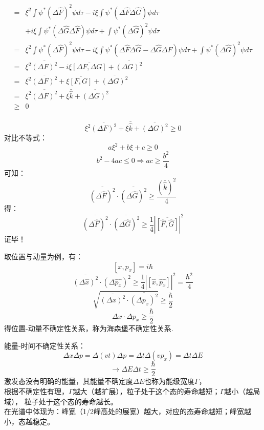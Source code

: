 \begin{frame}   
    $$
    \begin{aligned}
    =& \xi^{2} \int \psi^{*}(\Delta \hat{F})^{2} \psi d \tau-i \xi \int \psi^{*}(\Delta \hat{F} \Delta \hat{G}) \psi d \tau \\
    &+i \xi \int \psi^{*}(\Delta \hat{G} \Delta \hat{F}) \psi d \tau+\int \psi^{*}(\Delta \hat{G})^{2} \psi d \tau \\
    =& \xi^{2} \int \psi^{*}(\Delta \hat{F})^{2} \psi d \tau-i \xi \int \psi^{*}(\Delta \hat{F} \Delta \hat{G}-\Delta \hat{G} \Delta \hat{F}) \psi d \tau+\int \psi^{*}(\Delta \hat{G})^{2} \psi d \tau \\
    =& \xi^{2} \overline{(\Delta F)^{2}}-i \xi \overline{[\Delta F, \Delta G]}+\overline{(\Delta G)^{2}}\\
    =&\xi^{2} \overline{(\Delta F)^{2}}+\xi \overline{[F, G]}+\overline{(\Delta G)^{2}} \\
    =&\xi^{2} \overline{(\Delta F)^{2}}+\xi \bar{\hat{k}}+\overline{(\Delta G)^{2}} \\
    \geq & 0\\
    \end{aligned}
    $$
\end{frame} 

\begin{frame} 
    \[\xi^{2} \overline{(\Delta F)^{2}}+\xi \bar{\hat{k}}+\overline{(\Delta G)^{2}} \geq  0\]  
    对比不等式：
    $$
    a \xi^{2}+b \xi+c \geq 0
    $$
    $$
    b^{2}-4 a c \leq 0 \Rightarrow a c \geq \frac{b^{2}}{4}
    $$
    可知： 
    $$
    \overline{(\Delta \hat{F})^{2}} \cdot \overline{(\Delta \hat{G})^{2}} \geq \frac{(\bar{\hat{k}})^{2}}{4}
    $$
    得： 
    $$
    \boxed{\overline{(\Delta \hat{F})^{2}} \cdot \overline{(\Delta \hat{G})^{2}} \geq \frac{1}{4}|\overline{[\hat{F}, \hat{G}]}|^{2}}
    $$
    证毕！
\end{frame} 

\begin{frame}
取位置与动量为例，有：
$$ [x,p_x]=i\hbar $$
$$
\overline{(\Delta \hat{x})^{2}} \cdot \overline{(\Delta \hat{p_x})^{2}} 
\geq \frac{1}{4}|\overline{[\hat{x}, \hat{p_x}]}|^{2}=\frac{\hbar^2}{4}
$$
$$
\sqrt{\overline{(\Delta x)^{2}} \cdot \overline{(\Delta p_x)^{2}}} 
\geq \frac{\hbar}{2}
$$
$$  
\boxed{\Delta x \cdot \Delta p_x 
\geq \frac{\hbar}{2}}
$$ 
得位置-动量不确定性关系，称为海森堡不确定性关系.
\end{frame}

\begin{frame}
    能量-时间不确定性关系：
    \[\Delta x \Delta p = \Delta (vt)  \Delta p = \Delta t  \Delta (vp_x)= \Delta t  \Delta E \]
    \[\to \Delta E \Delta t \geq \frac{\hbar}{2}  \]
    {\Bullet} 激发态没有明确的能量，其能量不确定度$\Delta E$也称为能级宽度$\Gamma$，\\ \vspace{0.6em}
    {\Bullet} 根据不确定性有理，$\Gamma$越大（越扩展），粒子处于这个态的寿命越短；$\Gamma$越小（越局域），
    粒子处于这个态的寿命越长。\\ \vspace{0.6em}
    {\Bullet} 在光谱中体现为：峰宽（1/2峰高处的展宽）越大，对应的态寿命越短；峰宽越小，态越稳定。 
\end{frame}

